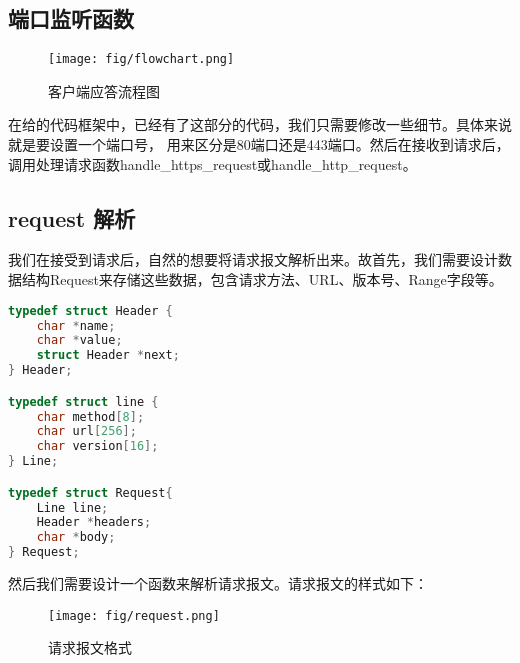 \documentclass[11pt]{article}
\begin{document}
\subsection{端口监听函数}
\begin{figure}[H]
\centering
\texttt{[image: fig/flowchart.png]}
\caption{客户端应答流程图}
\end{figure}

在给的代码框架中，已经有了这部分的代码，我们只需要修改一些细节。具体来说就是要设置一个端口号，
用来区分是80端口还是443端口。然后在接收到请求后，调用处理请求函数handle\_https\_request或handle\_http\_request。

\subsection{request 解析}
我们在接受到请求后，自然的想要将请求报文解析出来。故首先，我们需要设计数据结构Request来存储这些数据，包含请求方法、URL、版本号、Range字段等。
\begin{lstlisting}[language=C]
typedef struct Header {
    char *name;
    char *value;
    struct Header *next;
} Header;

typedef struct line {
    char method[8];
    char url[256];
    char version[16];
} Line;

typedef struct Request{
    Line line;
    Header *headers;
    char *body;
} Request;
\end{lstlisting}

然后我们需要设计一个函数来解析请求报文。请求报文的样式如下：
\begin{figure}[H]
\centering
\texttt{[image: fig/request.png]}
\caption{请求报文格式}
\end{figure}
\end{document}
